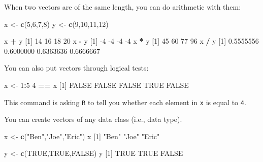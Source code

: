 \documentclass[
]{book}
\newenvironment{Shaded}{\begin{snugshade}}{\end{snugshade}}
\newcommand{\DecValTok}[1]{\textcolor[rgb]{0.00,0.00,0.81}{#1}}
\newcommand{\FloatTok}[1]{\textcolor[rgb]{0.00,0.00,0.81}{#1}}
\newcommand{\KeywordTok}[1]{\textcolor[rgb]{0.13,0.29,0.53}{\textbf{#1}}}
\newcommand{\NormalTok}[1]{#1}
\newcommand{\OperatorTok}[1]{\textcolor[rgb]{0.81,0.36,0.00}{\textbf{#1}}}
\newcommand{\OtherTok}[1]{\textcolor[rgb]{0.56,0.35,0.01}{#1}}
\newcommand{\StringTok}[1]{\textcolor[rgb]{0.31,0.60,0.02}{#1}}
\begin{document}
When two vectors are of the same length, you can do arithmetic with them:

\begin{Shaded}
\begin{Highlighting}[]
\NormalTok{x <-}\StringTok{ }\KeywordTok{c}\NormalTok{(}\DecValTok{5}\NormalTok{,}\DecValTok{6}\NormalTok{,}\DecValTok{7}\NormalTok{,}\DecValTok{8}\NormalTok{)}
\NormalTok{y <-}\StringTok{ }\KeywordTok{c}\NormalTok{(}\DecValTok{9}\NormalTok{,}\DecValTok{10}\NormalTok{,}\DecValTok{11}\NormalTok{,}\DecValTok{12}\NormalTok{)}

\NormalTok{x }\OperatorTok{+}\StringTok{ }\NormalTok{y}
\NormalTok{[}\DecValTok{1}\NormalTok{] }\DecValTok{14} \DecValTok{16} \DecValTok{18} \DecValTok{20}
\NormalTok{x }\OperatorTok{-}\StringTok{ }\NormalTok{y}
\NormalTok{[}\DecValTok{1}\NormalTok{] }\DecValTok{-4} \DecValTok{-4} \DecValTok{-4} \DecValTok{-4}
\NormalTok{x }\OperatorTok{*}\StringTok{ }\NormalTok{y}
\NormalTok{[}\DecValTok{1}\NormalTok{] }\DecValTok{45} \DecValTok{60} \DecValTok{77} \DecValTok{96}
\NormalTok{x }\OperatorTok{/}\StringTok{ }\NormalTok{y}
\NormalTok{[}\DecValTok{1}\NormalTok{] }\FloatTok{0.5555556} \FloatTok{0.6000000} \FloatTok{0.6363636} \FloatTok{0.6666667}
\end{Highlighting}
\end{Shaded}

You can also put vectors through logical tests:

\begin{Shaded}
\begin{Highlighting}[]
\NormalTok{x <-}\StringTok{ }\DecValTok{1}\OperatorTok{:}\DecValTok{5}
\DecValTok{4} \OperatorTok{==}\StringTok{ }\NormalTok{x}
\NormalTok{[}\DecValTok{1}\NormalTok{] }\OtherTok{FALSE} \OtherTok{FALSE} \OtherTok{FALSE}  \OtherTok{TRUE} \OtherTok{FALSE}
\end{Highlighting}
\end{Shaded}

This command is asking \texttt{R} to tell you whether each element in \texttt{x} is equal to \texttt{4}.

You can create vectors of any data class (i.e., data type).

\begin{Shaded}
\begin{Highlighting}[]
\NormalTok{x <-}\StringTok{ }\KeywordTok{c}\NormalTok{(}\StringTok{"Ben"}\NormalTok{,}\StringTok{"Joe"}\NormalTok{,}\StringTok{"Eric"}\NormalTok{) }
\NormalTok{x}
\NormalTok{[}\DecValTok{1}\NormalTok{] }\StringTok{"Ben"}  \StringTok{"Joe"}  \StringTok{"Eric"}

\NormalTok{y <-}\StringTok{ }\KeywordTok{c}\NormalTok{(}\OtherTok{TRUE}\NormalTok{,}\OtherTok{TRUE}\NormalTok{,}\OtherTok{FALSE}\NormalTok{)}
\NormalTok{y}
\NormalTok{[}\DecValTok{1}\NormalTok{]  }\OtherTok{TRUE}  \OtherTok{TRUE} \OtherTok{FALSE}
\end{Highlighting}
\end{Shaded}
\end{document}

